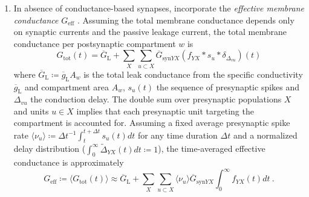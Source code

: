 \begin{enumerate}
\item In absence of conductance-based synapses, incorporate the \emph{effective membrane conductance} $G_\text{eff}$ 
.
Assuming the total membrane conductance depends only on synaptic currents and the passive leakage current,
the total membrane conductance per postsynaptic compartment $w$ is
\begin{equation}
G_{\text{tot}}(t) = \overline{G}_\text{L} + \sum_X \sum_{u \subset X} \overline{G}_{\text{syn}YX} \left( f_{YX} \ast s_u \ast \delta_{\Delta_{vu}} \right)(t)
\end{equation}
where $\overline{G}_\text{L} \coloneq \overline{g}_\text{L} A_w$ is the total leak conductance from the specific conductivity $\overline{g}_\text{L}$ and compartment area $A_w$, 
$s_u(t)$ the sequence of presynaptic spikes and $\Delta_{vu}$ the conduction delay. 
The double sum over presynaptic populations $X$ and units $u \in X$ implies that each presynaptic unit targeting the compartment is accounted for. 
Assuming a fixed average presynaptic spike rate $\langle \nu_u \rangle \coloneq \Delta t^{-1} \int_t^{t+\Delta t} s_u(t) dt$ for any time duration $\Delta t$ and a normalized delay distribution ($\int_0^\infty \widetilde{\Delta}_{YX}(t) dt \coloneq 1$), 
the time-averaged effective conductance is approximately
\begin{equation}
G_\text{eff} \coloneq \langle G_\text{tot}(t) \rangle \approx \overline{G}_\text{L} + \sum_X \sum_{u \subset X} \langle \nu_u \rangle \overline{G}_{\text{syn}YX} \int_0^\infty f_{YX}(t) dt ~.
\end{equation}


\end{enumerate}
